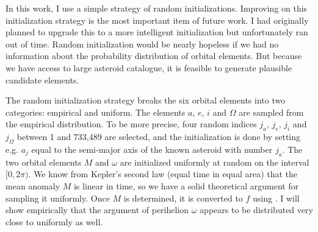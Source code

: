 In this work, I use a simple strategy of random initializations.
Improving on this initialization strategy is the most important item of future work.
I had originally planned to upgrade this to a more intelligent initialization but unfortunately ran out of time.
Random initialization would be nearly hopeless if we had no information about the probability distribution of orbital elements.
But because we have access to large asteroid catalogue, it is feasible to generate plausible candidate elements.

The random initialization strategy breaks the six orbital elements into two categories: empirical and uniform.
The elements $a$, $e$, $i$ and $\Omega$ are sampled from the empirical distribution.
To be more precise, four random indices $j_{a}$, $j_{e}$, $j_{i}$ and $j_{\Omega}$ between 1 and 733,489 are selected, 
and the initialization is done by setting e.g. $a_{j}$ equal to the semi-major axis of the known asteroid with number $j_{a}$.
The two orbital elements $M$ and $\omega$ are initialized uniformly at random on the interval $[0, 2\pi)$.
We know from Kepler's second law (equal time in equal area) that the mean anomaly $M$ is linear in time,
so we have a solid theoretical argument for sampling it uniformly.
Once $M$ is determined, it is converted to $f$ using .
I will show empirically that the argument of perihelion $\omega$ appears to be distributed very close to uniformly as well.

